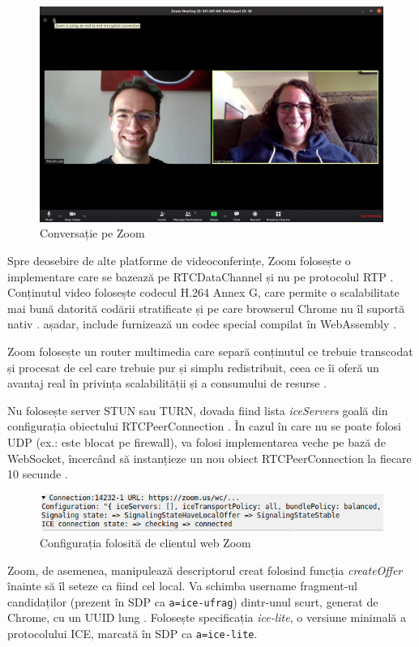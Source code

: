 \begin{figure}[!htbp]
    \centering
    \includegraphics[width=13cm]{figures/zoom_call.jpg}
    \caption{Conversație pe Zoom}
\end{figure}
\indent \par Spre deosebire de alte platforme de videoconferințe, Zoom folosește o implementare care se bazează pe RTCDataChannel și nu pe protocolul RTP \cite{ZoomWebRTC}. Conținutul video folosește codecul H.264 Annex G, care permite o scalabilitate mai bună datorită codării stratificate și pe care browserul Chrome nu îl suportă nativ \cite{ZoomScalability, ZoomWebRTC}. așadar, include furnizează un codec special compilat în WebAssembly \cite{ZoomWebRTC}.
\indent \par Zoom folosește un router multimedia care separă conținutul ce trebuie transcodat și procesat de cel care trebuie pur și simplu redistribuit, ceea ce îi oferă un avantaj real în privința scalabilității și a consumului de resurse \cite{ZoomScalability}.
\indent \par Nu folosește server STUN sau TURN, dovada fiind lista \textit{iceServers} goală din configurația obiectului RTCPeerConnection \cite{ZoomWebRTC}. În cazul în care nu se poate folosi UDP (ex.: este blocat pe firewall), va folosi implementarea veche pe bază de WebSocket, încercând să instanțieze un nou obiect RTCPeerConnection la fiecare 10 secunde \cite{ZoomWebRTC}.
\begin{figure}[!htbp]
    \centering
    \includegraphics[width=14cm]{figures/zoom_no_ice_servers.png}
    \caption{Configurația folosită de clientul web Zoom \cite{ZoomWebRTC}}
\end{figure}
\indent \par Zoom, de asemenea, manipulează descriptorul creat folosind funcția \textit{createOffer} înainte să îl seteze ca fiind cel local. Va schimba username fragment-ul candidaților (prezent în SDP ca \texttt{a=ice-ufrag}) dintr-unul scurt, generat de Chrome, cu un UUID lung \cite{ZoomWebRTC}. Folosește specificația \textit{ice-lite}, o versiune minimală a protocolului ICE, marcată în SDP ca \texttt{a=ice-lite}.